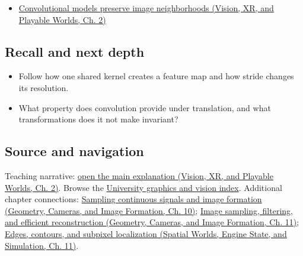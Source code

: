 \hypertarget{appendix-47c51ea026fb-full-teaching-explanation}{}

\begin{itemize}
\tightlist
\item
  \href{../07-Vision-XR-and-Playable-Worlds/main.pdf\#nameddest=04-visual-computing-ii-ch031-convolutional-models-preserve-image-neighborhoods}{Convolutional models preserve image neighborhoods (Vision, XR, and Playable Worlds, Ch. 2)}
\end{itemize}

\subsection{Recall and next depth}\label{appendix-47c51ea026fb-recall-and-next-depth}

\hypertarget{appendix-47c51ea026fb-recall-and-next-depth}{}

\begin{itemize}
\tightlist
\item
  Follow how one shared kernel creates a feature map and how stride changes its resolution.
\item
  What property does convolution provide under translation, and what transformations does it not make invariant?
\end{itemize}

\subsection{Source and navigation}\label{appendix-47c51ea026fb-source-and-navigation}

\hypertarget{appendix-47c51ea026fb-source-and-navigation}{}

Teaching narrative: \href{../07-Vision-XR-and-Playable-Worlds/main.pdf\#nameddest=04-visual-computing-ii-ch031-convolutional-models-preserve-image-neighborhoods}{open the main explanation (Vision, XR, and Playable Worlds, Ch. 2)}. Browse the \hyperref[appendix-a6d556a4ef50-university-graphics-vision-and-photography---independent-series]{University graphics and vision index}. Additional chapter connections: \href{../03-Geometry-Cameras-and-Image-Formation/main.pdf\#nameddest=03-visual-computing-i-ch003-sampling-continuous-signals-and-image-formation}{Sampling continuous signals and image formation (Geometry, Cameras, and Image Formation, Ch. 10)}; \href{../03-Geometry-Cameras-and-Image-Formation/main.pdf\#nameddest=03-visual-computing-i-ch004-image-sampling-filtering-and-efficient-reconstruction}{Image sampling, filtering, and efficient reconstruction (Geometry, Cameras, and Image Formation, Ch. 11)}; \href{../05-Spatial-Worlds-Engine-State-and-Simulation/main.pdf\#nameddest=04-visual-computing-ii-ch030-edges-contours-and-subpixel-localization}{Edges, contours, and subpixel localization (Spatial Worlds, Engine State, and Simulation, Ch. 11)}.

